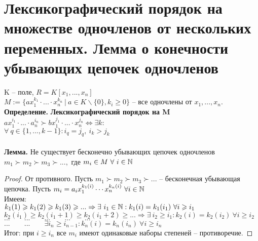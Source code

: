 \section{Лексикографический порядок на множестве одночленов от нескольких переменных. Лемма о конечности убывающих цепочек одночленов}

K -- поле, $R=K[x_1,...,x_n]$\\
$M:=\{ax_1^{k_1}\cdot...\cdot x_n^{k_n}\ |\ a\in K\backslash\{0\}, k_i\geqslant 0\}$ -- все одночлены от $x_1,...,x_n$.\\
\textbf{Определение.} \textbf{Лексикографический порядок на M}\\
$ax_1^{i_1}\cdot...\cdot a_n^{i_n}\succ bx_1^{j_1}\cdot...\cdot x_n^{j_n}\Leftrightarrow \exists k:$\\
$\forall\ q\in \{1,...,k-1\}: i_q=j_q, \ i_k>j_k$\\\\
\textbf{Лемма.} Не существует бесконечно убывающих цепочек одночленов
\\$m_1\succ m_2\succ m_3\succ ..., $ где $m_i\in M \ \forall \ i \in \mathbb{N}$
\begin{proof}
    От противного. Пусть $m_1\succ m_2 \succ m_3\succ ...$ -- бесконечная убывающая цепочка. Пусть $m_i=a_ix_1^{k_1(i)}\cdots x_n^{k_n(i)}\ \forall i\in \mathbb{N}$\\
    Имеем:\\
    $k_1(1)\geqslant k_1(2)\geqslant k_1(3)\geqslant ...\Rightarrow \exists \ i_1\in \N:k_1(i)=k_1(i_1)\ \forall i \geqslant i_1$\\
    $k_2(i_1)\geqslant k_2(i_1+1)\geqslant k_2(i_1+2)\geqslant ...\Rightarrow \exists \ i_2\geqslant i_1:k_2(i)=k_2(i_2)\ \forall i \geqslant i_2$\\
    $... \qquad ... \qquad ... \qquad ... \qquad ...$\\
    $... \qquad ... \qquad \exists i_n\geqslant i_{n-1}:k_n(i)=k_n(i_n)\ \forall i\geqslant i_n$\\
    Итог: при $i\geqslant i_n$ все $m_i$ имеют одинаковые наборы степеней -- противоречие.
\end{proof}